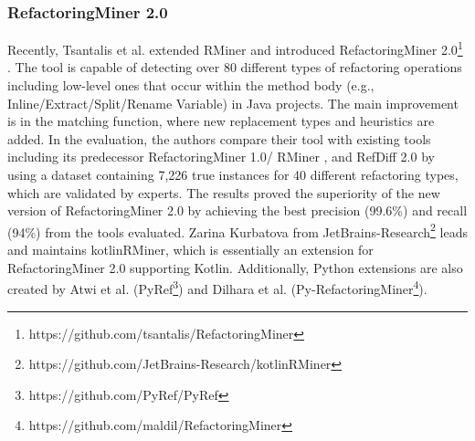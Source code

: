 \documentclass[letterpaper,12pt,onecolumn,final]{report}
\begin{document}
\subsubsection{RefactoringMiner 2.0}
Recently, Tsantalis et al. extended RMiner \cite{Tsantalis2018} and introduced RefactoringMiner 2.0\footnote{https://github.com/tsantalis/RefactoringMiner} \cite{Tsantalis2020}. The tool is capable of detecting over 80 different types of refactoring operations including low-level ones that occur within the method body (e.g., Inline/Extract/Split/Rename Variable) in Java projects. The main improvement is in the matching function, where new replacement types and heuristics are added. In the evaluation, the authors compare their tool with existing tools including its predecessor RefactoringMiner 1.0/ RMiner \cite{Tsantalis2018}, and RefDiff 2.0 \cite{Silva2020} by using a dataset containing 7,226 true instances for 40 different refactoring types, which are validated by experts. The results proved the superiority of the new version of RefactoringMiner 2.0 by achieving the best precision (99.6\%) and recall (94\%) from the tools evaluated. Zarina Kurbatova from JetBrains-Research\footnote{https://github.com/JetBrains-Research/kotlinRMiner} leads and maintains kotlinRMiner, which is essentially an extension for RefactoringMiner 2.0 supporting Kotlin. Additionally, Python extensions are also created by Atwi et al. \cite{Atwi2021} (PyRef\footnote{https://github.com/PyRef/PyRef}) and Dilhara et al. (Py-RefactoringMiner\footnote{https://github.com/maldil/RefactoringMiner}).
\end{document}
